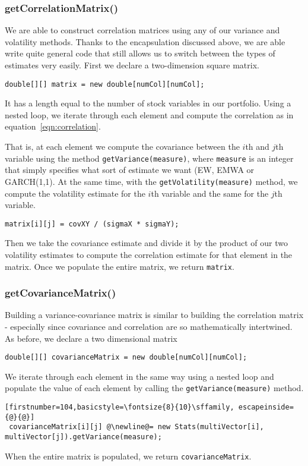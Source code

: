 \documentclass[../Dissertation.tex]{subfiles}
\begin{document}
\subsubsection{getCorrelationMatrix()}

 We are able to construct correlation matrices using any of our variance and volatility methods.
 Thanks to the encapsulation discussed above, we are able write quite general code that still allows us to switch between the types of estimates very easily.
 First we declare a two-dimension square matrix. 
 \begin{center}
 	\lstinline|double[][] matrix = new double[numCol][numCol];|
 \end{center}
 It has a length equal to the number of stock variables in our portfolio.
 Using a nested loop, we iterate through each element and compute the correlation as in equation~\ref{eqn:correlation}.
 
That is, at each element we compute the covariance between the $i$th and $j$th variable using the method \lstinline|getVariance(measure)|, where \lstinline|measure| is an integer that simply specifies what sort of estimate we want (EW, EMWA or GARCH(1,1).
At the same time, with the \lstinline|getVolatility(measure)| method, we compute the volatility estimate for the $i$th variable and the same for the $j$th variable.
\begin{lstlisting}[firstnumber = 94]
	matrix[i][j] = covXY / (sigmaX * sigmaY);
\end{lstlisting}
Then we take the covariance estimate and divide it by the product of our two volatility estimates to compute the correlation estimate for that element in the matrix.
Once we populate the entire matrix, we return \lstinline|matrix|.


\subsubsection{getCovarianceMatrix()}

Building a variance-covariance matrix is similar to building the correlation matrix - especially since covariance and correlation are so mathematically intertwined.
As before, we declare a two dimensional matrix
\begin{lstlisting}[firstnumber = 101]
 	double[][] covarianceMatrix = new double[numCol][numCol];
\end{lstlisting}
 We iterate through each element in the same way using a nested loop and populate the value of each element by calling the \lstinline|getVariance(measure)| method.
 \begin{lstlisting}[firstnumber=104,basicstyle=\fontsize{8}{10}\sffamily, escapeinside={@}{@}]
 covarianceMatrix[i][j] @\newline@= new Stats(multiVector[i], multiVector[j]).getVariance(measure);
 \end{lstlisting}
 When the entire matrix is populated, we return \lstinline|covarianceMatrix|.
\end{document}
